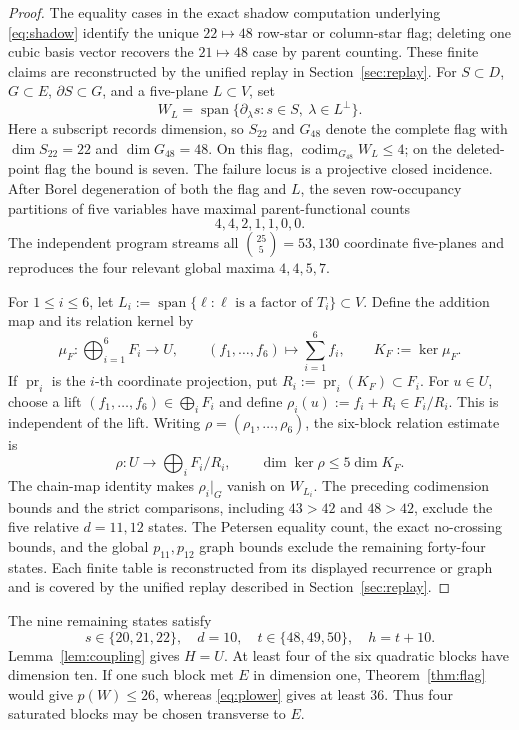 \documentclass[11pt,reqno]{amsart}
\theoremstyle{definition}
\newcommand{\Span}{\operatorname{span}}
\begin{document}
\begin{proof}
The equality cases in the exact shadow computation underlying
\eqref{eq:shadow} identify the unique \(22\mapsto48\) row-star or column-star
flag; deleting one cubic basis vector recovers the \(21\mapsto48\) case by
parent counting. These finite claims are reconstructed by the unified replay
in Section~\ref{sec:replay}. For \(S\subset D\), \(G\subset E\),
\(\partial S\subset G\), and a five-plane \(L\subset V\), set
\[
 W_L=\Span\{\partial_\lambda s:s\in S,\ \lambda\in L^\perp\}.
\]
Here a subscript records dimension, so \(S_{22}\) and \(G_{48}\) denote the
complete flag with \(\dim S_{22}=22\) and \(\dim G_{48}=48\). On this flag,
\(\operatorname{codim}_{G_{48}}W_L\le4\); on the deleted-point flag the bound is
seven. The failure locus is a projective closed incidence. After Borel
degeneration of both the flag and \(L\), the seven row-occupancy partitions
of five variables have maximal parent-functional counts
\[
 4,4,2,1,1,0,0.
\]
The independent program streams all \(\binom{25}{5}=53{,}130\) coordinate
five-planes and reproduces the four relevant global maxima \(4,4,5,7\).

For \(1\le i\le6\), let
\(L_i:=\Span\{\ell:\ell\text{ is a factor of }T_i\}\subset V\). Define
the addition map and its relation kernel by
\[
 \mu_F:\bigoplus_{i=1}^6F_i\longrightarrow U,
 \qquad (f_1,\ldots,f_6)\longmapsto\sum_{i=1}^6f_i,
 \qquad K_F:=\ker\mu_F.
\]
If \(\operatorname{pr}_i\) is the \(i\)-th coordinate projection, put
\(R_i:=\operatorname{pr}_i(K_F)\subset F_i\). For \(u\in U\), choose a lift
\((f_1,\ldots,f_6)\in\bigoplus_iF_i\) and define
\(\rho_i(u):=f_i+R_i\in F_i/R_i\). This is independent of the lift. Writing
\(\rho=(\rho_1,\ldots,\rho_6)\), the six-block relation estimate is
\[
 \rho:U\longrightarrow\bigoplus_iF_i/R_i,\qquad
 \dim\ker\rho\le5\dim K_F.
\]
The chain-map identity makes \(\rho_i|_G\) vanish on \(W_{L_i}\). The
preceding codimension bounds and the strict comparisons, including \(43>42\)
and \(48>42\), exclude the five relative \(d=11,12\) states. The Petersen
equality count, the exact no-crossing bounds, and the global \(p_{11},p_{12}\)
graph bounds exclude the remaining forty-four states. Each finite table is
reconstructed from its displayed recurrence or graph and is covered by the
unified replay described in Section~\ref{sec:replay}.
\end{proof}

The nine remaining states satisfy
\begin{equation}\label{eq:dten}
 s\in\{20,21,22\},\quad d=10,\quad
 t\in\{48,49,50\},\quad h=t+10.
\end{equation}
Lemma~\ref{lem:coupling} gives \(H=U\). At least four of the six quadratic
blocks have dimension ten. If one such block met \(E\) in dimension one,
Theorem~\ref{thm:flag} would give \(p(W)\le26\), whereas
\eqref{eq:plower} gives at least \(36\). Thus four saturated blocks may be
chosen transverse to \(E\).
\end{document}
